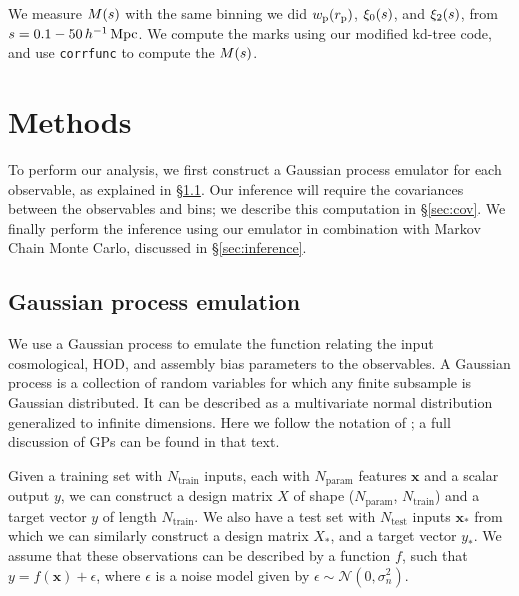 We measure $M(s)$ with the same binning we did $w_\mathrm{p}(r_\mathrm{p})$, $\xi_0(s)$, and $\xi_2(s)$, from $s = 0.1-50 \, h^{-1}\,\mathrm{Mpc}$.
We compute the marks using our modified kd-tree code, and use \texttt{corrfunc} \citep{SinhaGarrison2019, Sinha2020} to compute the $M(s)$.


\section{Methods}
\label{sec:methods}

To perform our analysis, we first construct a Gaussian process emulator for each observable, as explained in \S\ref{sec:gp}.
Our inference will require the covariances between the observables and bins; we describe this computation in \S\ref{sec:cov}.
We finally perform the inference using our emulator in combination with Markov Chain Monte Carlo, discussed in \S\ref{sec:inference}.

\subsection{Gaussian process emulation}
\label{sec:gp}

We use a Gaussian process to emulate the function relating the input cosmological, HOD, and assembly bias parameters to the observables.
A Gaussian process is a collection of random variables for which any finite subsample is Gaussian distributed.
It can be described as a multivariate normal distribution generalized to infinite dimensions.
Here we follow the notation of \cite{RasmussenWilliams2006}; a full discussion of GPs can be found in that text.

Given a training set with $N_\mathrm{train}$ inputs, each with $N_\mathrm{param}$ features $\bm{x}$ and a scalar output $y$, we can construct a design matrix $X$ of shape ($N_\mathrm{param}$, $N_\mathrm{train}$) and a target vector $y$ of length $N_\mathrm{train}$.
We also have a test set with $N_\mathrm{test}$ inputs $\bm{x}_*$ from which we can similarly construct a design matrix $X_*$, and a target vector $y_*$.
We assume that these observations can be described by a function $f$, such that $y = f(\bm{x}) + \epsilon$, where $\epsilon$ is a noise model given by $\epsilon \sim \mathcal{N}(0, \sigma_n^2)$.


